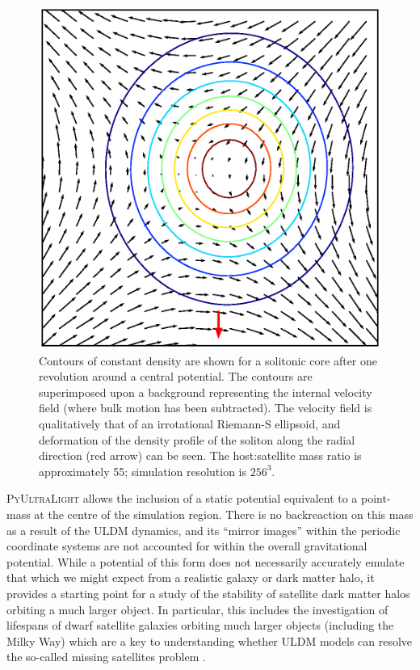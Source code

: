 \documentclass[a4paper,11pt]{article}
\newcommand{\PyUltraLight}{\textsc{PyUltraLight}\xspace}
\begin{document}
\begin{figure}
  \includegraphics[width=1.\textwidth,trim=1cm 1cm 0 1cm,clip]{riemann}
  \caption{Contours of constant density are shown for a solitonic core after one revolution around a central potential. The contours are superimposed upon a background representing the internal velocity field (where bulk motion has been subtracted). The velocity field is qualitatively that of an irrotational Riemann-S ellipsoid, and deformation of the density profile of the soliton along the radial direction (red arrow) can be seen. The host:satellite mass ratio is approximately 55; simulation resolution is $256^3$.}
  \label{fig:riemann}
\end{figure}

\PyUltraLight allows the inclusion of a static potential equivalent to a point-mass  at the centre of the simulation region.  There is no backreaction on this mass as a result of the ULDM dynamics, and its ``mirror images'' within the periodic coordinate systems are not accounted for within the overall gravitational potential. While a potential of this form does not necessarily accurately emulate that which we might expect from a realistic galaxy or dark matter halo, it provides a starting point for a study of the stability of satellite dark matter halos orbiting a much larger object. In particular, this includes the investigation of lifespans of dwarf satellite galaxies orbiting much larger objects (including the Milky Way) which are a key to understanding whether ULDM models can resolve the so-called missing satellites problem \cite{Weinberg2015}.
\end{document}
